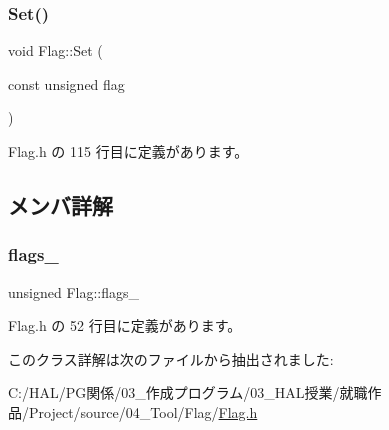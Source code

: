 \subsubsection{\texorpdfstring{Set()}{Set()}}
{\footnotesize\ttfamily void Flag\+::\+Set (\begin{DoxyParamCaption}\item[{const unsigned}]{flag }\end{DoxyParamCaption})\hspace{0.3cm}{\ttfamily [inline]}}



 Flag.\+h の 115 行目に定義があります。



\subsection{メンバ詳解}
\mbox{\label{class_flag_abd957aebe38d770132485740992bc41e}} 
\subsubsection{\texorpdfstring{flags\+\_\+}{flags\_}}
{\footnotesize\ttfamily unsigned Flag\+::flags\+\_\+\hspace{0.3cm}{\ttfamily [private]}}



 Flag.\+h の 52 行目に定義があります。



このクラス詳解は次のファイルから抽出されました\+:\begin{DoxyCompactItemize}
\item 
C\+:/\+H\+A\+L/\+P\+G関係/03\+\_\+作成プログラム/03\+\_\+\+H\+A\+L授業/就職作品/\+Project/source/04\+\_\+\+Tool/\+Flag/\mbox{\hyperlink{_flag_8h}{Flag.\+h}}\end{DoxyCompactItemize}
